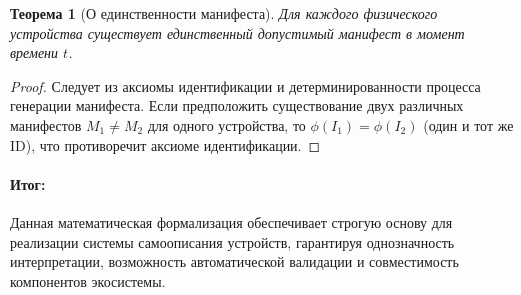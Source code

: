 \documentclass{article}
\newtheorem{theorem}{Теорема}
\begin{document}
\begin{theorem}[О единственности манифеста]
Для каждого физического устройства существует единственный допустимый манифест в момент времени $t$.
\end{theorem}

\begin{proof}
Следует из аксиомы идентификации и детерминированности процесса генерации манифеста. Если предположить существование двух различных манифестов $M_1 \neq M_2$ для одного устройства, то $\phi(I_1) = \phi(I_2)$ (один и тот же ID), что противоречит аксиоме идентификации.
\end{proof}

\paragraph{Итог:} Данная математическая формализация обеспечивает строгую основу для реализации системы самоописания устройств, гарантируя однозначность интерпретации, возможность автоматической валидации и совместимость компонентов экосистемы.
\end{document}
